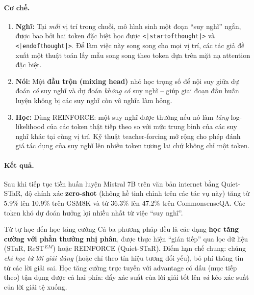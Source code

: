 \paragraph{Cơ chế.}
\begin{enumerate}
	\item \textbf{Nghĩ:} Tại \emph{mỗi} vị trí trong chuỗi, mô hình sinh một đoạn “suy nghĩ” ngắn, được bao bởi hai token đặc biệt học được \texttt{<|startofthought|>} và \texttt{<|endofthought|>}. Để làm việc này song song cho mọi vị trí, các tác giả đề xuất một thuật toán lấy mẫu song song theo token dựa trên mặt nạ attention đặc biệt.
	\item \textbf{Nói:} Một \textbf{đầu trộn (mixing head)} nhỏ học trọng số để nội suy giữa dự đoán \emph{có} suy nghĩ và dự đoán \emph{không có} suy nghĩ -- giúp giai đoạn đầu huấn luyện không bị các suy nghĩ còn vô nghĩa làm hỏng.
	\item \textbf{Học:} Dùng REINFORCE: một suy nghĩ được thưởng nếu nó làm \emph{tăng} log-likelihood của các token thật tiếp theo so với mức trung bình của các suy nghĩ khác tại cùng vị trí. Kỹ thuật teacher-forcing mở rộng cho phép đánh giá tác dụng của suy nghĩ lên nhiều token tương lai chứ không chỉ một token.
\end{enumerate}

\paragraph{Kết quả.} Sau khi tiếp tục tiền huấn luyện Mistral 7B trên văn bản internet bằng Quiet-STaR, độ chính xác \textbf{zero-shot} (không hề tinh chỉnh trên các tác vụ này) tăng từ 5.9\% lên 10.9\% trên GSM8K và từ 36.3\% lên 47.2\% trên CommonsenseQA. Các token khó dự đoán hưởng lợi nhiều nhất từ việc “suy nghĩ”.

\begin{deepdive}{Từ tự học đến học tăng cường}
Cả ba phương pháp đều là các dạng \textbf{học tăng cường với phần thưởng nhị phân}, được thực hiện “gián tiếp” qua lọc dữ liệu (STaR, ReST$^{EM}$) hoặc REINFORCE (Quiet-STaR). Điểm hạn chế chung: chúng \emph{chỉ học từ lời giải đúng} (hoặc chỉ theo tín hiệu tương đối yếu), bỏ phí thông tin từ các lời giải sai. Học tăng cường trực tuyến với advantage có dấu (mục tiếp theo) tận dụng được cả hai phía: đẩy xác suất của lời giải tốt lên \emph{và} kéo xác suất của lời giải tệ xuống.
\end{deepdive}
